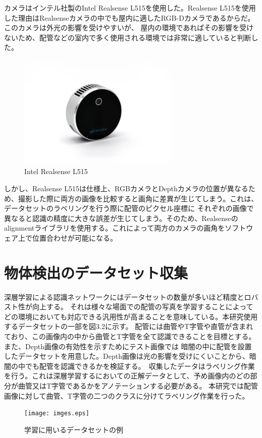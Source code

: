 カメラはインテル社製のIntel Realsense L515を使用した。Realsense L515を使用した理由はRealsenseカメラの中でも屋内に適したRGB-Dカメラであるからだ。このカメラは外光の影響を受けやすいが、
屋内の環境であればその影響を受けないため、配管などの室内で多く使用される環境では非常に適していると判断した。
\begin{figure}[htbt]
    \centering
     \includegraphics[height=55mm]{realsense.eps}
     \caption{Intel Realsense L515}
     \label{fig:f2}
\end{figure}

しかし、Realsense L515は仕様上、RGBカメラとDepthカメラの位置が異なるため、撮影した際に両方の画像を比較すると画角に差異が生じてしまう。これは、データセットのラベリングを行う際に配管のピクセル座標に
それぞれの画像で異なると認識の精度に大きな誤差が生じてしまう。そのため、Realsenseのalignmentライブラリを使用する。これによって両方のカメラの画角をソフトウェア上で位置合わせが可能になる。

\section{物体検出のデータセット収集}
深層学習による認識ネットワークにはデータセットの数量が多いほど精度とロバスト性が向上する。
それは様々な場面での配管の写真を学習することによってどの環境においても対応できる汎用性が高まることを意味している。本研究使用するデータセットの一部を図3.2に示す。
配管には曲管やT字管や直管が含まれており、この画像内の中から曲管とT字管を全て認識できることを目標とする。また、Depth画像の有効性を示すためにテスト画像では
暗闇の中に配管を設置したデータセットを用意した。Depth画像は光の影響を受けにくいことから、暗闇の中でも配管を認識できるかを検証する。\
収集したデータはラベリング作業を行う。これは深層学習するにおいての正解データとして、予め画像内のどの部分が曲管又はT字管であるかをアノテーションする必要がある。
本研究では配管画像に対して曲管、T字管の二つのクラスに分けてラベリング作業を行った。

\begin{figure}[htbt]
	\centering
	 \texttt{[image: imges.eps]}
	 \caption{学習に用いるデータセットの例}
	 \label{fig:f2}
\end{figure}

